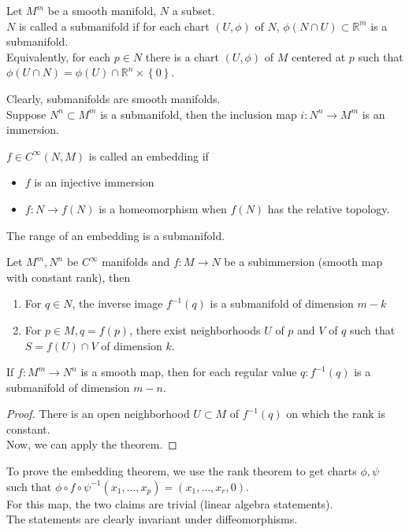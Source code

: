 \documentclass[../main.tex]{subfiles}
\begin{document}
\begin{defn}[Submanifold]
Let $M^{m}$ be a smooth manifold, $N$ a subset.\\
$N$ is called a submanifold if for each chart $( U,\phi) $ of $N$, $\phi( N \cap U) \subset \mathbb{R}^{m}$ is a submanifold.\\
Equivalently, for each $p\in N$ there is a chart $( U,\phi) $ of $M$ centered at $p$ such that $\phi( U\cap N) = \phi( U) \cap \mathbb{R}^n\times \left\{ 0 \right\} $.
\end{defn}
Clearly, submanifolds are smooth manifolds.\\
Suppose $N^{n} \subset M^{m}$ is a submanifold, then the inclusion map $i: N^{n}\to M^{m}$ is an immersion.
\begin{defn}
	$f\in C^{ \infty }( N,M) $ is called an embedding if
	\begin{itemize}
	\item $f$ is an injective immersion
	\item $f: N\to f( N) $ is a homeomorphism when $f( N) $ has the relative topology.
	\end{itemize}
\end{defn}
The range of an embedding is a submanifold.
\begin{thm}
	Let $M^{m},N^{n}$ be $C^{ \infty }$ manifolds and $f:M\to N$ be a subimmersion (smooth map with constant rank), then
	\begin{enumerate}
	\item For $q\in N$, the inverse image $f^{-1}( q) $ is a submanifold of dimension $m-k $ 
	\item For $p \in M, q= f( p) $, there exist neighborhoods $U$ of $p$ and $V$ of $q$ such that $S= f( U) \cap V$ of dimension $k$.
	\end{enumerate}
\end{thm}
\begin{crly}
If $f:M^{m}\to N^{n}$ is a smooth map, then for each regular value $q: f^{-1}( q) $ is a submanifold of dimension $m-n$.
\end{crly}
\begin{proof}
There is an open neighborhood $U \subset M$ of $f^{-1 } ( q) $ on which the rank is constant.\\
Now, we can apply the theorem.
\end{proof}
To prove the embedding theorem, we use the rank theorem to get charts $\phi, \psi$ such that $\phi\circ f \circ \psi^{-1}( x_1,\ldots,x_p) = ( x_1,\ldots,x_r,  0) $.\\
For this map, the two claims are trivial (linear algebra statements).\\
The statements are clearly invariant under diffeomorphisms.
\end{document}
